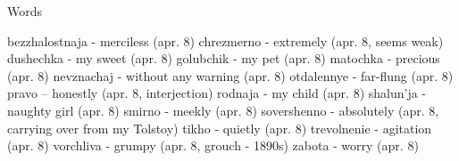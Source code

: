 Words

bezzhalostnaja - merciless (apr. 8)
chrezmerno - extremely (apr. 8, seems weak)
dushechka - my sweet (apr. 8)
golubchik - my pet (apr. 8)
matochka - precious (apr. 8)
nevznachaj - without any warning (apr. 8)
otdalennye - far-flung (apr. 8)
pravo -- honestly (apr. 8, interjection)
rodnaja - my child (apr. 8)
shalun'ja - naughty girl (apr. 8)
smirno - meekly (apr. 8)
sovershenno - absolutely (apr. 8, carrying over from my Tolstoy)
tikho - quietly (apr. 8)
trevolnenie - agitation (apr. 8)
vorchliva - grumpy (apr. 8, grouch - 1890s)
zabota - worry (apr. 8)